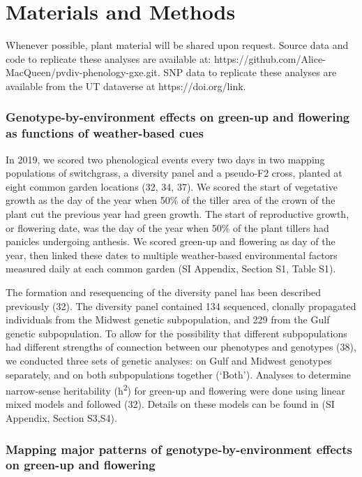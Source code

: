 \documentclass[
  9pt,
  twocolumn,
  twoside]{pnas-new}
\begin{document}
\section{Materials and Methods}\label{materials-and-methods}

Whenever possible, plant material will be shared upon request. Source
data and code to replicate these analyses are available at:
https://github.com/Alice-MacQueen/pvdiv-phenology-gxe.git. SNP data to
replicate these analyses are available from the UT dataverse at
https://doi.org/link.

\subsubsection{Genotype-by-environment effects on green-up and flowering
as functions of weather-based
cues}\label{genotype-by-environment-effects-on-green-up-and-flowering-as-functions-of-weather-based-cues}

In 2019, we scored two phenological events every two days in two mapping
populations of switchgrass, a diversity panel and a pseudo-F2 cross,
planted at eight common garden locations (32, 34, 37). We scored the
start of vegetative growth as the day of the year when 50\% of the
tiller area of the crown of the plant cut the previous year had green
growth. The start of reproductive growth, or flowering date, was the day
of the year when 50\% of the plant tillers had panicles undergoing
anthesis. We scored green-up and flowering as day of the year, then
linked these dates to multiple weather-based environmental factors
measured daily at each common garden (SI Appendix, Section S1, Table
S1).

The formation and resequencing of the diversity panel has been described
previously (32). The diversity panel contained 134 sequenced, clonally
propagated individuals from the Midwest genetic subpopulation, and 229
from the Gulf genetic subpopulation. To allow for the possibility that
different subpopulations had different strengths of connection between
our phenotypes and genotypes (38), we conducted three sets of genetic
analyses: on Gulf and Midwest genotypes separately, and on both
subpopulations together (`Both'). Analyses to determine narrow-sense
heritability (h\textsuperscript{2}) for green-up and flowering were done
using linear mixed models and followed (32). Details on these models can
be found in (SI Appendix, Section S3,S4).

\subsubsection{Mapping major patterns of genotype-by-environment effects
on green-up and
flowering}\label{mapping-major-patterns-of-genotype-by-environment-effects-on-green-up-and-flowering}
\end{document}
